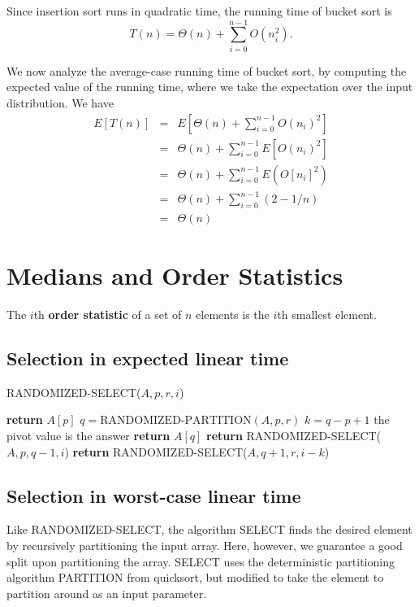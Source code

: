 \documentclass[12pt]{article}
\begin{document}
Since insertion sort runs in quadratic time, the running time of bucket sort is
\begin{equation*}
  T(n) = \Theta(n) + \sum_{i=0}^{n-1} O(n_i^2).
\end{equation*}

We now analyze the average-case running time of bucket sort, by computing the expected value of the running time, where we take the expectation over the input distribution. We have
\begin{eqnarray*}
  E[T(n)]
  &=& E \left[ \Theta (n) + \sum_{i=0}^{n-1} O(n_i)^2 \right] \\
  &=& \Theta (n) + \sum_{i=0}^{n-1} E \left[ O(n_i)^2 \right] \\
  &=& \Theta (n) + \sum_{i=0}^{n-1} E \left( O[n_i]^2 \right) \\
  &=& \Theta (n) + \sum_{i=0}^{n-1} (2 - 1/n) \\
  &=& \Theta (n)
\end{eqnarray*}

\section{Medians and Order Statistics}

The $i$th \textbf {order statistic} of a set of $n$ elements is the $i$th smallest element.

\subsection{Selection in expected linear time}

RANDOMIZED-SELECT($A, p, r, i$)
\begin{algorithmic}[1]
	\State \textbf {return } $A[p]$
\EndIf
\State $q = \text{RANDOMIZED-PARTITION}(A, p, r)$
\State $k = q - p + 1$
\Comment the pivot value is the answer
	\State \textbf {return} $A[q]$
	\State \textbf {return} RANDOMIZED-SELECT($A, p, q-1, i$)
\Else
	\State \textbf {return} RANDOMIZED-SELECT($A, q+1, r, i-k$)
\EndIf
\end{algorithmic}

\subsection{Selection in worst-case linear time}

Like RANDOMIZED-SELECT, the algorithm SELECT finds the desired element by recursively partitioning the input array. Here, however, we guarantee a good split upon partitioning the array. SELECT uses the deterministic partitioning algorithm PARTITION from quicksort, but modified to take the element to partition around as an input parameter. \\
\end{document}
